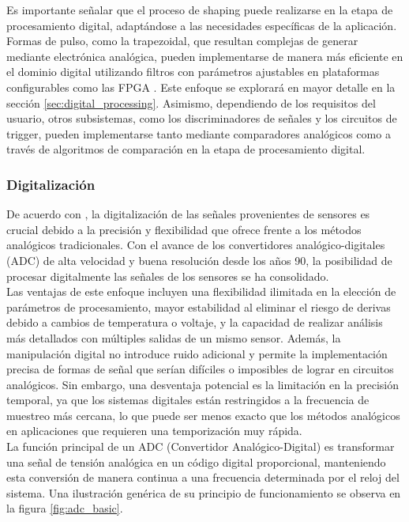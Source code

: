\documentclass[]{book}
\begin{document}
\noindent Es importante señalar que el proceso de shaping puede realizarse en la etapa de procesamiento digital, adaptándose a las necesidades específicas de la aplicación. Formas de pulso, como la trapezoidal, que resultan complejas de generar mediante electrónica analógica, pueden implementarse de manera más eficiente en el dominio digital utilizando filtros con parámetros ajustables en plataformas configurables como las FPGA \cite{radeka1968optimum}. Este enfoque se explorará en mayor detalle en la sección \ref{sec:digital_processing}. Asimismo, dependiendo de los requisitos del usuario, otros subsistemas, como los discriminadores de señales y los circuitos de trigger, pueden implementarse tanto mediante comparadores analógicos como a través de algoritmos de comparación en la etapa de procesamiento digital.

\subsubsection{Digitalización}
\noindent De acuerdo con \cite{meyer2007digital}, la digitalización de las señales provenientes de sensores es crucial debido a la precisión y flexibilidad que ofrece frente a los métodos analógicos tradicionales. Con el avance de los convertidores analógico-digitales (ADC) de alta velocidad y buena resolución desde los años 90, la posibilidad de procesar digitalmente las señales de los sensores se ha consolidado.\\

\noindent Las ventajas de este enfoque incluyen una flexibilidad ilimitada en la elección de parámetros de procesamiento, mayor estabilidad al eliminar el riesgo de derivas debido a cambios de temperatura o voltaje, y la capacidad de realizar análisis más detallados con múltiples salidas de un mismo sensor. Además, la manipulación digital no introduce ruido adicional y permite la implementación precisa de formas de señal que serían difíciles o imposibles de lograr en circuitos analógicos. Sin embargo, una desventaja potencial es la limitación en la precisión temporal, ya que los sistemas digitales están restringidos a la frecuencia de muestreo más cercana, lo que puede ser menos exacto que los métodos analógicos en aplicaciones que requieren una temporización muy rápida.\\

\noindent La función principal de un ADC (Convertidor Analógico-Digital) es transformar una señal de tensión analógica en un código digital proporcional, manteniendo esta conversión de manera continua a una frecuencia determinada por el reloj del sistema. Una ilustración genérica de su principio de funcionamiento se observa en la figura \ref{fig:adc_basic}. 
\end{document}

